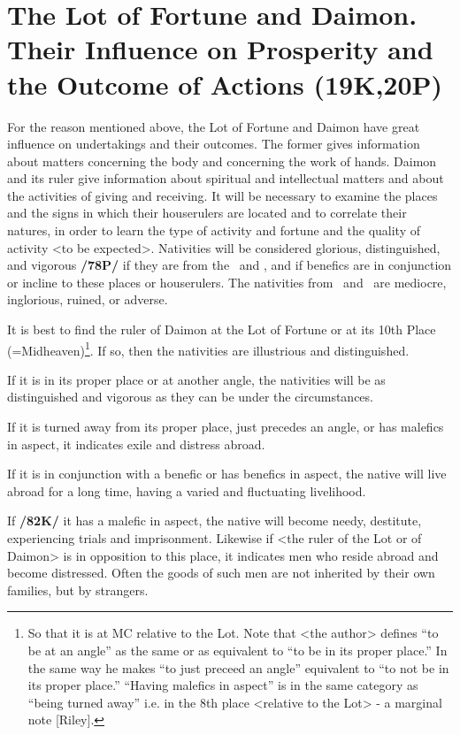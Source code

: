 \section{The Lot of Fortune and Daimon. Their Influence on Prosperity and the Outcome of Actions (19K,20P)}
 
For the reason mentioned above, the Lot of Fortune and Daimon have great influence on undertakings and their outcomes. The former gives information about matters concerning the body and concerning the work of hands. Daimon and its ruler give information about spiritual and intellectual matters and about the activities of giving and receiving. It will be necessary to examine the places and the signs in which their houserulers are located and to correlate their natures, in order to learn the type of activity and fortune and the quality of activity <to be expected>. Nativities will be considered glorious, distinguished, and vigorous \textbf{/78P/} if they are from the \Sun\, and \Moon, and if benefics are in conjunction or incline to these places or houserulers. The nativities from \Saturn\, and \Mars\, are mediocre, inglorious, ruined, or adverse. 

It is best to find the ruler of Daimon at the Lot of Fortune or at its 10th Place (=Midheaven)\footnote{So that it is at MC relative to the Lot. Note that <the author> defines “to be at an angle” as the same or as equivalent to “to be in its proper place.” In the same way he makes “to just preceed an angle” equivalent to “to not be in its proper place.” “Having malefics in aspect” is in the same category as “being turned away” i.e. in the 8th place <relative to the Lot> - a marginal note [Riley].}. If so, then the nativities are illustrious and
distinguished. 

If it is in its proper place or at another angle, the nativities will be as distinguished and vigorous as they can be under the circumstances. 

If it is turned away from its proper place, just precedes an angle, or has malefics in aspect, it indicates exile and distress abroad. 

If it is in conjunction with a benefic or has benefics in aspect, the native will live abroad for a long time, having a varied and fluctuating livelihood. 

If \textbf{/82K/} it has a malefic in aspect, the native will become needy, destitute, experiencing trials and imprisonment. Likewise if <the ruler of the Lot or of Daimon> is in opposition to this place, it indicates men who reside abroad and become distressed. Often the goods of such men are not inherited by their own families, but by strangers.

\newpage